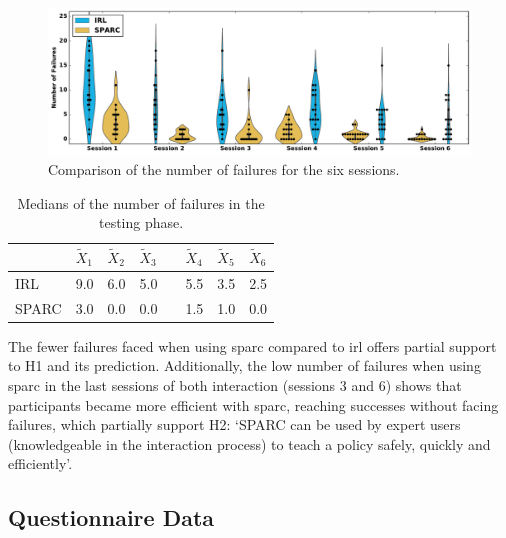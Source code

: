 \begin{figure}[ht]
	\includegraphics[width=\textwidth]{failures.pdf}
	\centering
	\caption{Comparison of the number of failures for the six sessions.
	}
	\label{fig:control_failures}
\end{figure}

\begin{table}[ht]
	\centering
	\caption{Medians of the number of failures in the testing phase.}
	\label{tab:control_failures}
	\begin{tabular}{@{}llllllll@{}}\toprule
		& $\widetilde{X}_{1}$ & $\widetilde{X}_{2}$ & $\widetilde{X}_{3}$ && $\widetilde{X}_{4}$ & $\widetilde{X}_{5}$ & $\widetilde{X}_{6}$\\ 
		\midrule
	    IRL & 9.0 & 6.0 & 5.0 &\crossarr& 5.5 & 3.5 & 2.5\\
	    SPARC & 3.0 & 0.0 & 0.0 && 1.5 & 1.0 & 0.0\\
	    \bottomrule
	\end{tabular}
\end{table}

The fewer failures faced when using \gls{sparc} compared to \gls{irl} offers partial support to H1 and its prediction. Additionally, the low number of failures when using \gls{sparc} in the last sessions of both interaction (sessions 3 and 6) shows that participants became more efficient with \gls{sparc}, reaching successes without facing failures, which partially support H2: `SPARC can be used by expert users (knowledgeable in the interaction process) to teach a policy safely, quickly and efficiently'.

\subsection{Questionnaire Data}

